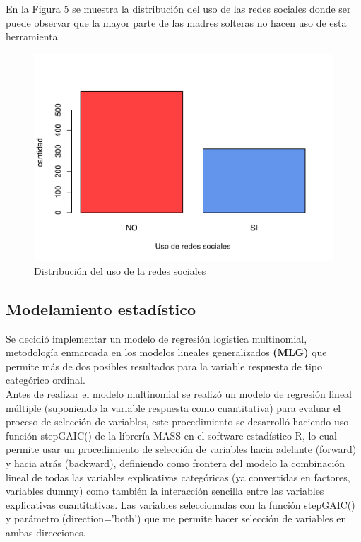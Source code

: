\documentclass[11pt,twoside]{article}
\begin{document}
\vspace{140px}
\noindent
En la Figura 5 se muestra la distribución del uso de las redes sociales donde ser puede observar que la mayor parte de las madres solteras no hacen uso de esta herramienta.
\begin{figure}[H]
	\centering
	\includegraphics{usoderedes.pdf}
	\caption{Distribución del uso de la redes sociales}
\end{figure}



\subsection{Modelamiento estadístico}
\noindent
Se decidió implementar un modelo de regresión logística multinomial, metodología enmarcada en los modelos lineales generalizados\textbf{ (MLG)} que permite más de dos posibles resultados para la variable respuesta de tipo categórico ordinal. 
\\
Antes de realizar el modelo multinomial se realizó un modelo de regresión lineal múltiple (suponiendo la variable respuesta como cuantitativa) para evaluar el proceso de selección de variables, este procedimiento se desarrolló haciendo uso función stepGAIC() de la librería MASS en el software estadístico R, lo cual permite usar un procedimiento de selección de variables hacia adelante (forward) y hacia atrás (backward), definiendo como frontera del modelo la combinación lineal de todas las variables explicativas categóricas (ya convertidas en factores, variables dummy) como también la interacción sencilla entre las variables explicativas cuantitativas.
Las variables seleccionadas con la función stepGAIC() y parámetro (direction=’both’) que me permite hacer selección de variables en ambas direcciones.
\end{document}
